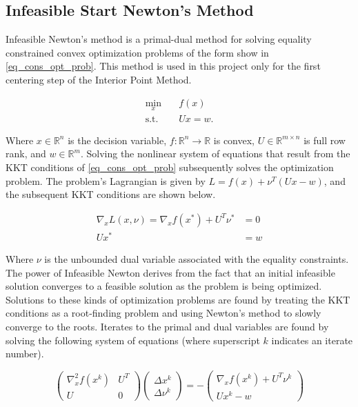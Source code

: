 \documentclass{exam}
\begin{document}
\begin{multicols*}{2}
\subsection{Infeasible Start Newton's Method}

Infeasible Newton's method is a primal-dual method for solving equality constrained convex optimization problems of the form show in \eqref{eq_cons_opt_prob}. This method is used in this project only for the first centering step of the Interior Point Method.

\begin{equation}
    \label{eq_cons_opt_prob}
    \begin{aligned}
        \min_{x} \quad & f(x) \\
        \textrm{s.t.} \quad & Ux = w.
    \end{aligned}
\end{equation}

Where $x \in \mathbb{R}^n$ is the decision variable, $f : \mathbb{R}^n \rightarrow \mathbb{R}$ is convex, $U \in \mathbb{R}^{m \times n}$ is full row rank, and $w \in \mathbb{R}^m$. Solving the nonlinear system of equations that result from the KKT conditions of \eqref{eq_cons_opt_prob} subsequently solves the optimization problem. The problem's Lagrangian is given by $L = f(x) + \nu^T\left( Ux - w \right)$, and the subsequent KKT conditions are shown below.

\begin{equation}
    \label{eq_cons_opt_prob_kkt}
    \begin{aligned}
        \nabla_x L(x, \nu) = \nabla_x f(x^*) + U^T\nu^* &= 0 \\
        Ux^* &= w
    \end{aligned}
\end{equation}

Where $\nu$ is the unbounded dual variable associated with the equality constraints. The power of Infeasible Newton derives from the fact that an initial infeasible solution converges to a feasible solution as the problem is being optimized. Solutions to these kinds of optimization problems are found by treating the KKT conditions as a root-finding problem and using Newton's method to slowly converge to the roots. Iterates to the primal and dual variables are found by solving the following system of equations (where superscript $k$ indicates an iterate number).

\begin{equation}
    \label{infeas_newt_deltas}
    \begin{pmatrix}
        \nabla^2_x f(x^k) & U^T \\
        U & 0
    \end{pmatrix}
    \begin{pmatrix}
        \Delta x^k \\
        \Delta \nu^k
    \end{pmatrix} = 
    -\begin{pmatrix}
        \nabla_xf(x^k) + U^T \nu^k \\
        Ux^k - w
    \end{pmatrix}
\end{equation}


\end{multicols*}
\end{document}
